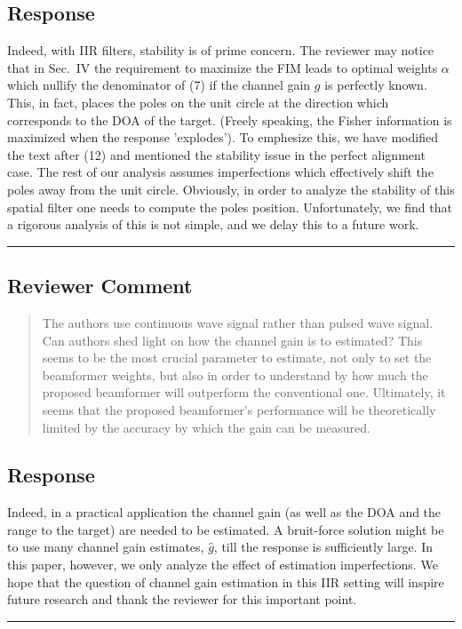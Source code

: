 \subsection{Response} 
Indeed, with IIR filters, stability is of prime concern. The reviewer may notice that in Sec.~IV the requirement to maximize the FIM leads to optimal weights $\alpha$ which nullify the denominator of (7) if the channel gain $g$ is perfectly known. This, in fact, places the poles on the unit circle at the direction which corresponds to the DOA of the target. (Freely speaking, the Fisher information is maximized when the response 'explodes').
To emphesize this, we have modified the text after (12) and mentioned the stability issue in the perfect alignment case.
The rest of our analysis assumes imperfections which effectively shift the poles away from the unit circle.  Obviously, in order to analyze the stability of this spatial filter one needs to compute the poles position. Unfortunately, we find that a rigorous analysis of this is not simple, and we delay this to a future work.  \\

\noindent\rule{17cm}{2.0pt}

\subsection{Reviewer Comment}
\begin{mdframed}
\begin{quote}
	The authors use continuous wave signal rather than pulsed wave signal. Can authors shed light on how the channel gain is to estimated? This seems to be the most crucial parameter to estimate, not only to set the beamformer weights, but also in order to understand by how much the proposed beamformer will outperform the conventional one. Ultimately, it seems that the proposed beamformer's performance will be theoretically limited by the accuracy by which the gain can be measured.
\end{quote}
\end{mdframed}

\subsection{Response}  
Indeed, in a practical application the channel gain (as well as the DOA and the range to the target) are needed to be estimated. A bruit-force solution might be to use many channel gain estimates, $\hat{g}$, till the response is sufficiently large.
In this paper, however, we only analyze the effect of estimation imperfections.
We hope that the question of channel gain estimation in this IIR setting will inspire future research and thank the reviewer for this important point.
\\
\noindent\rule{17cm}{2.0pt}

